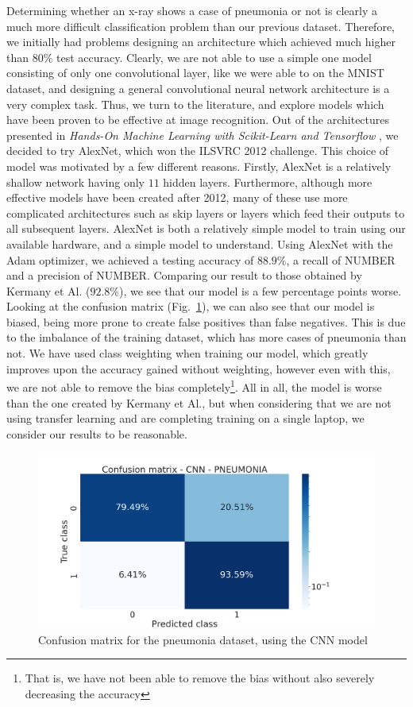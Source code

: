 \documentclass[onecolumn,10pt,cleanfoot]{asme2ej}
\begin{document}
Determining whether an x-ray shows a case of pneumonia or not is clearly a much more difficult classification problem than our previous dataset. Therefore, we initially had problems designing an architecture which achieved much higher than $80\%$ test accuracy. Clearly, we are not able to use a simple one model consisting of only one convolutional layer, like we were able to on the MNIST dataset, and designing a general convolutional neural network architecture is a very complex task. Thus, we turn to the literature, and explore models which have been proven to be effective at image recognition. Out of the architectures presented in {\it Hands-On Machine Learning with Scikit-Learn and Tensorflow} \cite{geron}, we decided to try AlexNet, which won the ILSVRC 2012 challenge. This choice of model was motivated by a few different reasons. Firstly, AlexNet is a relatively shallow network having only $11$ hidden layers. Furthermore, although more effective models have been created after 2012, many of these use more complicated architectures such as skip layers or layers which feed their outputs to all subsequent layers. AlexNet is both a relatively simple model to train using our available hardware, and a simple model to understand. Using AlexNet with the Adam optimizer, we achieved a testing accuracy of $88.9\%$, a recall of NUMBER and a precision of NUMBER. Comparing our result to those obtained by Kermany et Al. ($92.8\%$), we see that our model is a few percentage points worse. Looking at the confusion matrix (Fig.~\ref{conf_cnn_pneu}), we can also see that our model is biased, being more prone to create false positives than false negatives. This is due to the imbalance of the training dataset, which has more cases of pneumonia than not. We have used class weighting when training our model, which greatly improves upon the accuracy gained without weighting, however even with this, we are not able to remove the bias completely\footnote{That is, we have not been able to remove the bias without also severely decreasing the accuracy}. All in all, the model is worse than the one created by Kermany et Al., but when considering that we are not using transfer learning and are completing training on a single laptop, we consider our results to be reasonable.

\begin{figure}[H]
\centerline{\includegraphics[width=5in]{figure/conf_cnn_pneu.png}}
\caption{Confusion matrix for the pneumonia dataset, using the CNN model}
\label{conf_cnn_pneu}
\end{figure}
\end{document}
